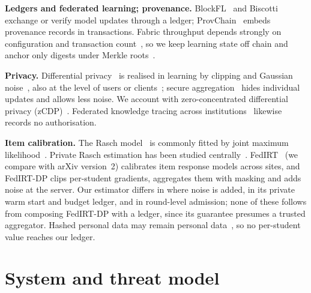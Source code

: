 \documentclass[pdflatex,iicol,sn-mathphys-num]{sn-jnl}
\theoremstyle{thmstyleone}
\begin{document}
\textbf{Ledgers and federated learning; provenance.} BlockFL~\cite{kim2020blockchained} and Biscotti~\cite{shayan2021biscotti} exchange or verify model updates through a ledger; ProvChain~\cite{liang2017provchain} embeds provenance records in transactions. Fabric throughput depends strongly on configuration and transaction count~\cite{thakkar2018performance,gorenflo2019fastfabric}, so we keep learning state off chain and anchor only digests under Merkle roots~\cite{merkle1988digital,laurie2013certificate}.

\textbf{Privacy.} Differential privacy~\cite{dwork2014algorithmic} is realised in learning by clipping and Gaussian noise~\cite{abadi2016deep}, also at the level of users or clients~\cite{mcmahan2018learning,geyer2017differentially}; secure aggregation~\cite{bonawitz2017practical} hides individual updates and allows less noise. We account with zero-concentrated differential privacy (zCDP)~\cite{bun2016concentrated}. Federated knowledge tracing across institutions~\cite{wu2021federated} likewise records no authorisation.

\textbf{Item calibration.} The Rasch model~\cite{rasch1960probabilistic} is commonly fitted by joint maximum likelihood~\cite{baker2004item}. Private Rasch estimation has been studied centrally~\cite{steiner2018differential,nguyen2023optimal}. FedIRT~\cite{zhou2025federated} (we compare with arXiv version~2) calibrates item response models across sites, and FedIRT-DP clips per-student gradients, aggregates them with masking and adds noise at the server. Our estimator differs in where noise is added, in its private warm start and budget ledger, and in round-level admission; none of these follows from composing FedIRT-DP with a ledger, since its guarantee presumes a trusted aggregator. Hashed personal data may remain personal data~\cite{finck2018blockchains}, so no per-student value reaches our ledger.

\section{System and threat model}\label{sec:model}
\end{document}
